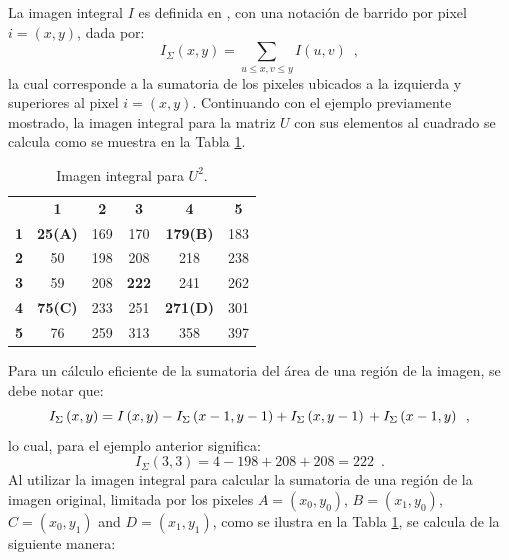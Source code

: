La imagen integral $I$ es definida en \cite{viola2001robust}, con una notaci\'on de barrido por pixel $i=(x,y)$, dada por: 
\begin{equation}
I_{\Sigma}\left(x,y\right)=\sum_{u\leq x,v\leq y}I\left(u,v\right) \enspace ,
\end{equation}
la cual corresponde a la sumatoria de los  pixeles ubicados a la izquierda y superiores al pixel $i=(x,y)$.
Continuando con el ejemplo previamente mostrado, la imagen integral para la matriz $U$ con sus elementos al cuadrado se calcula como se muestra en la Tabla \ref{tab_ImagenesIntegrales}. 
\begin{table}
\caption{Imagen integral para $U^2$.}
\begin{center}
\renewcommand{\arraystretch}{1.4}
\setlength\tabcolsep{3pt}


{
\begin{tabular}{cc|ccc|c}
 & \multicolumn{1}{c}{\textbf{1}} & \textbf{2} & \textbf{3} & \multicolumn{1}{c}{\textbf{4}} & \textbf{5}\tabularnewline
\textbf{1} & \multicolumn{1}{c}{\textbf{25(A)}} & 169 & 170 & \multicolumn{1}{c}{\textbf{179(B)}} & 183\tabularnewline
\cline{3-5} 
\textbf{2} & 50 & 198 & 208 & 218 & 238\tabularnewline
\textbf{3} & 59 & 208 & \textbf{222} & 241 & 262\tabularnewline
\textbf{4} & \textbf{75(C)} & 233 & 251 & \textbf{271(D)} & 301\tabularnewline
\cline{3-5} 
\textbf{5} & \multicolumn{1}{c}{76} & 259 & 313 & \multicolumn{1}{c}{358} & 397\tabularnewline
\end{tabular}
}


\par\end{center}
\label{tab_ImagenesIntegrales}
\end{table}
Para un c\'alculo eficiente de la sumatoria del \'area de una regi\'on de la imagen, se debe notar que: 
\begin{equation}
I_{\Sigma}\left(x,y\right)=I\left(x,y\right)-I_{\Sigma}\left(x-1,y-1\right)+I_{\Sigma}\left(x,y-1\right)
\\+I_{\Sigma}\left(x-1,y\right) \enspace ,
\end{equation}
lo cual, para el ejemplo anterior significa:
\begin{equation}
I_{\Sigma}\left(3,3\right)=4-198+208+208=222 \enspace .
\end{equation}
Al utilizar la imagen integral para calcular la sumatoria de una regi\'on de la imagen original, limitada por los pixeles $A=\left(x_{0},y_{0}\right)$,
$B=\left(x_{1},y_{0}\right)$, $C=\left(x_{0},y_{1}\right)$ and $D=\left(x_{1},y_{1}\right)$, como se ilustra en la Tabla \ref{tab_ImagenesIntegrales}, se calcula de la siguiente manera: 

